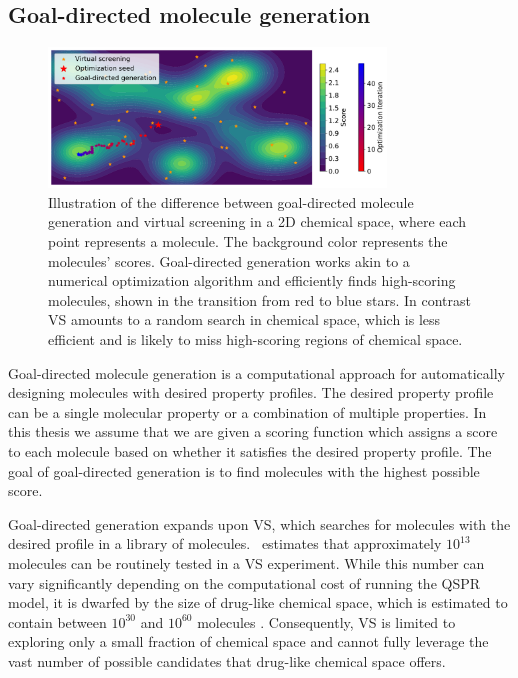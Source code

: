 \subsection{Goal-directed molecule generation}
\begin{figure}
      \centering
      \includegraphics[width=0.8\textwidth]{./figures/goal_directed_generation_vs.pdf}
      \caption{Illustration of the difference between goal-directed molecule generation and virtual
            screening in a 2D chemical space, where each point represents a molecule. The
            background color represents the molecules' scores. Goal-directed generation works
            akin to a numerical optimization algorithm and efficiently finds high-scoring molecules,
            shown in the transition from red to blue stars. In contrast VS amounts to a random search in chemical space, which is less efficient
            and is likely to miss high-scoring regions of chemical space. \label{fig:goal-directed-generation}}
\end{figure}

Goal-directed molecule generation \citep{schneiderNovoMolecularDesign2013} is a computational
approach for automatically designing molecules with desired property profiles. The desired
property profile can be a single molecular property or a combination of multiple properties. In
this thesis we assume that we are given a scoring function which assigns a score to each molecule
based on whether it satisfies the desired property profile. The goal of goal-directed generation is
to find molecules with the highest possible score.

Goal-directed generation expands upon \ac{VS}, which searches for molecules with the desired profile
in a library of molecules.\ \citet{waltersVirtualChemicalLibraries2019} estimates that approximately
$10^{13}$ molecules can be routinely tested in a \ac{VS} experiment. While this number can vary
significantly depending on the computational cost of running the \ac{QSPR} model, it is dwarfed by
the size of drug-like chemical space, which is estimated to contain between $10^{30}$ and $10^{60}$
molecules \citep{waltersVirtualChemicalLibraries2019,ruddigkeitEnumeration166Billion2012}.
Consequently, \ac{VS} is limited to exploring only a small fraction of chemical space and cannot
fully leverage the vast number of possible candidates that drug-like chemical space offers.

